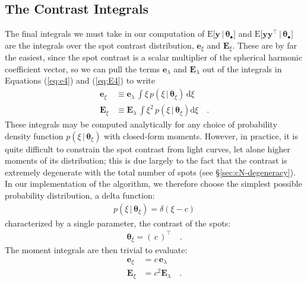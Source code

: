 \documentclass[modern]{aastex62}
\begin{document}
\subsection{The Contrast Integrals}
\label{sec:contrast}
%
The final integrals we must take in our computation of
$\mathrm{E} \big[ \mathbf{y} \, \big| \, \pmb{\theta}_\bullet \big]$
and $\mathrm{E} \big[ \mathbf{y} \mathbf{y}^\top \, \big| \, \pmb{\theta}_\bullet \big]$
are the integrals over
the spot contrast distribution, $\mathbf{e}_\xi$ and $\mathbf{E}_\xi$.
These are by far the easiest, since the spot contrast is a scalar
multiplier of the spherical harmonic coefficient vector, so we can
pull the terms $\mathbf{e}_\lambda$ and $\mathbf{E}_\lambda$ out
of the
integrals in Equations (\ref{eq:e4}) and (\ref{eq:E4}) to write
%
\begin{align}
    \mathbf{e}_\xi
     & \equiv
    \mathbf{e}_\lambda \,
    \int
    \xi \,
    p(\xi \, \big| \, \pmb{\theta}_{\xi}) \,
    \mathrm{d}\xi
    \\
    \mathbf{E}_\xi
     & \equiv
    \mathbf{E}_\lambda \,
    \int
    \xi^2 \,
    p(\xi \, \big| \, \pmb{\theta}_\xi)
    \mathrm{d}\xi
    \quad.
\end{align}
%
These integrals may be computed analytically for any choice of
probability density function $p(\xi \, \big| \, \pmb{\theta}_\xi)$
with closed-form moments.
%
However, in practice, it is quite difficult to constrain the
spot contrast from light curves, let alone higher moments of its
distribution; this is due largely to the fact that the contrast
is extremely degenerate with the total number of spots
(see \S\ref{sec:cN-degeneracy}).
%
In our implementation of the algorithm,
we therefore choose the simplest possible probability distribution,
a delta function:
%
\begin{align}
    p(\xi \, \big| \, \pmb{\theta}_{\xi}) = \delta(\xi - c)
\end{align}
%
characterized by a single parameter, the contrast of the spots:
%
\begin{align}
    \pmb{\theta}_\xi = \left( \, c \, \right)^\top
    \quad.
\end{align}
%
The moment integrals are then trivial to evaluate:
%
\begin{align}
    \mathbf{e}_\xi & = c \, \mathbf{e}_\lambda
    \\
    \mathbf{E}_\xi & = c^2 \mathbf{E}_\lambda
    \quad.
\end{align}
%
\end{document}
